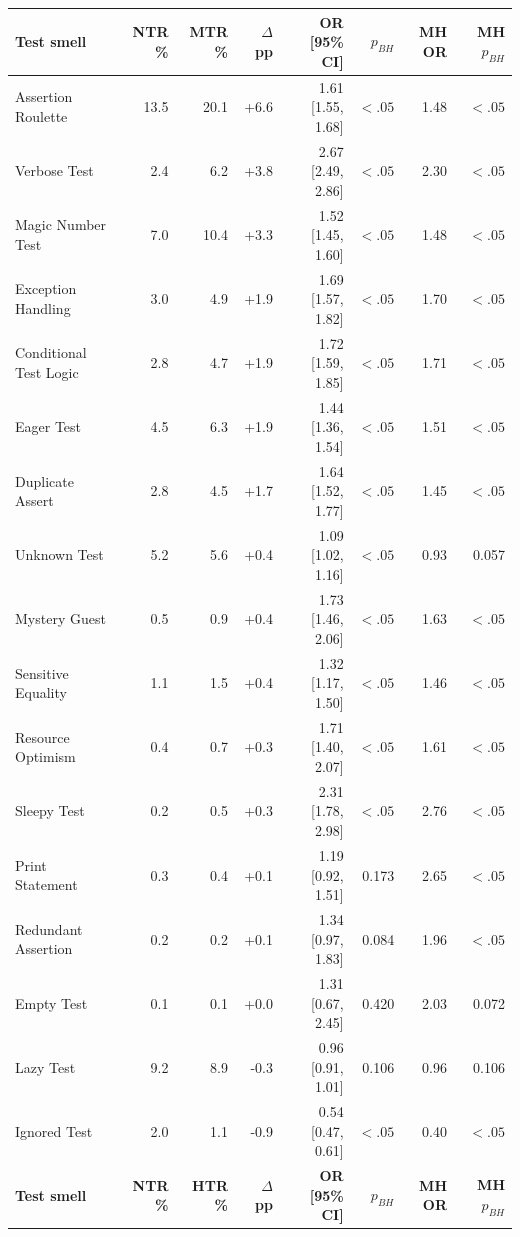 \begin{tabular}{lrrrrrrr}
\toprule
\textbf{Test smell} & \textbf{NTR \%} & \textbf{MTR \%} & \textbf{$\Delta$ pp} &
\textbf{OR [95\% CI]} & \textbf{$p_{BH}$} & \textbf{MH OR} & \textbf{MH $p_{BH}$} \\
\midrule
Assertion Roulette & 13.5 & 20.1 & +6.6 & 1.61 [1.55, 1.68] & $<.05$ & 1.48 & $<.05$ \\
Verbose Test & 2.4 & 6.2 & +3.8 & 2.67 [2.49, 2.86] & $<.05$ & 2.30 & $<.05$ \\
Magic Number Test & 7.0 & 10.4 & +3.3 & 1.52 [1.45, 1.60] & $<.05$ & 1.48 & $<.05$ \\
Exception Handling & 3.0 & 4.9 & +1.9 & 1.69 [1.57, 1.82] & $<.05$ & 1.70 & $<.05$ \\
Conditional Test Logic & 2.8 & 4.7 & +1.9 & 1.72 [1.59, 1.85] & $<.05$ & 1.71 & $<.05$ \\
Eager Test & 4.5 & 6.3 & +1.9 & 1.44 [1.36, 1.54] & $<.05$ & 1.51 & $<.05$ \\
Duplicate Assert & 2.8 & 4.5 & +1.7 & 1.64 [1.52, 1.77] & $<.05$ & 1.45 & $<.05$ \\
Unknown Test & 5.2 & 5.6 & +0.4 & 1.09 [1.02, 1.16] & $<.05$ & 0.93 & 0.057 \\
Mystery Guest & 0.5 & 0.9 & +0.4 & 1.73 [1.46, 2.06] & $<.05$ & 1.63 & $<.05$ \\
Sensitive Equality & 1.1 & 1.5 & +0.4 & 1.32 [1.17, 1.50] & $<.05$ & 1.46 & $<.05$ \\
Resource Optimism & 0.4 & 0.7 & +0.3 & 1.71 [1.40, 2.07] & $<.05$ & 1.61 & $<.05$ \\
Sleepy Test & 0.2 & 0.5 & +0.3 & 2.31 [1.78, 2.98] & $<.05$ & 2.76 & $<.05$ \\
Print Statement & 0.3 & 0.4 & +0.1 & 1.19 [0.92, 1.51] & 0.173 & 2.65 & $<.05$ \\
Redundant Assertion & 0.2 & 0.2 & +0.1 & 1.34 [0.97, 1.83] & 0.084 & 1.96 & $<.05$ \\
Empty Test & 0.1 & 0.1 & +0.0 & 1.31 [0.67, 2.45] & 0.420 & 2.03 & 0.072 \\
Lazy Test & 9.2 & 8.9 & -0.3 & 0.96 [0.91, 1.01] & 0.106 & 0.96 & 0.106 \\
Ignored Test & 2.0 & 1.1 & -0.9 & 0.54 [0.47, 0.61] & $<.05$ & 0.40 & $<.05$ \\%
\toprule
\textbf{Test smell} & \textbf{NTR \%} & \textbf{HTR \%} & \textbf{$\Delta$ pp} &
\textbf{OR [95\% CI]} & \textbf{$p_{BH}$} & \textbf{MH OR} & \textbf{MH $p_{BH}$} \\

\end{tabular}
